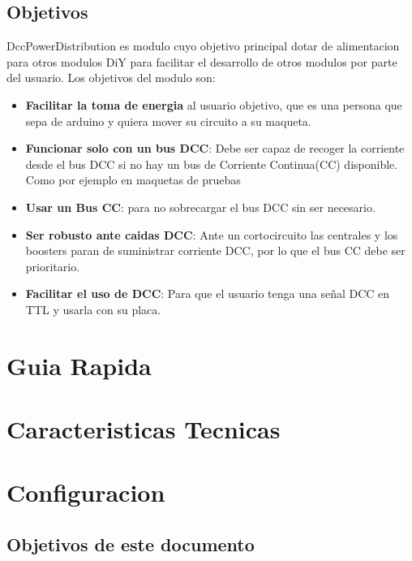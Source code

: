 \documentclass{DccDiyTools}
\begin{document}
\subsection{Objetivos}
DccPowerDistribution es modulo cuyo objetivo principal dotar de alimentacion para otros modulos DiY
para facilitar el desarrollo de otros modulos por parte del usuario. Los objetivos del modulo son:
\begin{itemize}
    \item \textbf{Facilitar la toma de energia} al usuario objetivo, que es una persona que sepa
de arduino y quiera mover su circuito a su maqueta.   
    \item \textbf{Funcionar solo con un bus DCC}: Debe ser capaz de recoger la corriente desde el bus
DCC si no hay un bus de Corriente Continua(CC) disponible. Como por ejemplo en maquetas de pruebas
    \item \textbf{Usar un Bus CC}: para no sobrecargar el bus DCC sin ser necesario.
    \item \textbf{Ser robusto ante caidas DCC}: Ante un cortocircuito las centrales y los boosters 
paran de suministrar corriente DCC, por lo que el bus CC debe ser prioritario.
    \item \textbf{Facilitar el uso de DCC}: Para que el usuario tenga una señal DCC en TTL y usarla
con su placa.
\end{itemize}

\newpage
\section{Guia Rapida}


\newpage
\section{Caracteristicas Tecnicas}

\section{Configuracion}
\subsection{Objetivos de este documento}

\end{document}
